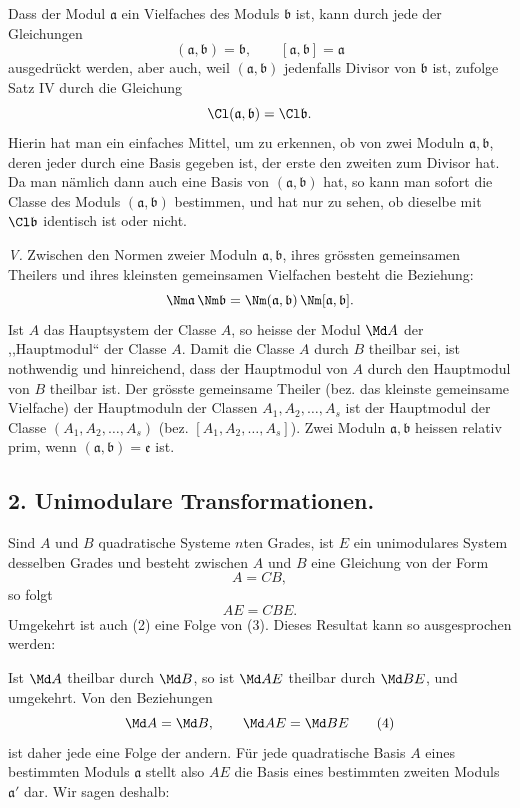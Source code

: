 Dass der Modul $\mathfrak a$ ein Vielfaches des Moduls $\mathfrak b$ ist, kann durch jede der Gleichungen
\[
 (\mathfrak a,\mathfrak b)=\mathfrak b,
 \qquad
 [\mathfrak a,\mathfrak b]=\mathfrak a
\]
ausgedrückt werden, aber auch, weil $(\mathfrak a,\mathfrak b)$ jedenfalls Divisor von $\mathfrak b$ ist, zufolge Satz IV durch die Gleichung
\[
 \Cl(\mathfrak a,\mathfrak b)=\Cl\mathfrak b.
\]
Hierin hat man ein einfaches Mittel, um zu erkennen, ob von zwei Moduln $\mathfrak a,\mathfrak b$, deren jeder durch eine Basis gegeben ist, der erste den zweiten zum Divisor hat. Da man nämlich dann auch eine Basis von $(\mathfrak a,\mathfrak b)$ hat, so kann man sofort die Classe des Moduls $(\mathfrak a,\mathfrak b)$ bestimmen, und hat nur zu sehen, ob dieselbe mit $\Cl\mathfrak b$ identisch ist oder nicht.

\emph{V.} Zwischen den Normen zweier Moduln $\mathfrak a,\mathfrak b$, ihres grössten gemeinsamen Theilers und ihres kleinsten gemeinsamen Vielfachen besteht die Beziehung:
\[
 \Nm\mathfrak a\,\Nm\mathfrak b
 =\Nm(\mathfrak a,\mathfrak b)\,\Nm[\mathfrak a,\mathfrak b].
\]
Ist $A$ das Hauptsystem der Classe $A$, so heisse der Modul $\Md A$ der ,,Hauptmodul`` der Classe $A$. Damit die Classe $A$ durch $B$ theilbar sei, ist nothwendig und hinreichend, dass der Hauptmodul von $A$ durch den Hauptmodul von $B$ theilbar ist. Der grösste gemeinsame Theiler (bez. das kleinste gemeinsame Vielfache) der Hauptmoduln der Classen $A_1,A_2,\ldots,A_s$ ist der Hauptmodul der Classe $(A_1,A_2,\ldots,A_s)$ (bez. $[A_1,A_2,\ldots,A_s]$). Zwei Moduln $\mathfrak a,\mathfrak b$ heissen relativ prim, wenn $(\mathfrak a,\mathfrak b)=\mathfrak e$ ist.

\subsection*{2. Unimodulare Transformationen.}

Sind $A$ und $B$ quadratische Systeme $n$ten Grades, ist $E$ ein unimodulares System desselben Grades und besteht zwischen $A$ und $B$ eine Gleichung von der Form
\begin{equation}
 A=CB,
\tag{2}
\end{equation}
so folgt
\begin{equation}
 AE=CBE.
\tag{3}
\end{equation}
Umgekehrt ist auch (2) eine Folge von (3). Dieses Resultat kann so ausgesprochen werden:

Ist $\Md A$ theilbar durch $\Md B$, so ist $\Md AE$ theilbar durch $\Md BE$, und umgekehrt. Von den Beziehungen
\begin{equation}
 \Md A=\Md B,
 \qquad
 \Md AE=\Md BE
\tag{4}
\end{equation}
ist daher jede eine Folge der andern. Für jede quadratische Basis $A$ eines bestimmten Moduls $\mathfrak a$ stellt also $AE$ die Basis eines bestimmten zweiten Moduls $\mathfrak a'$ dar. Wir sagen deshalb:

